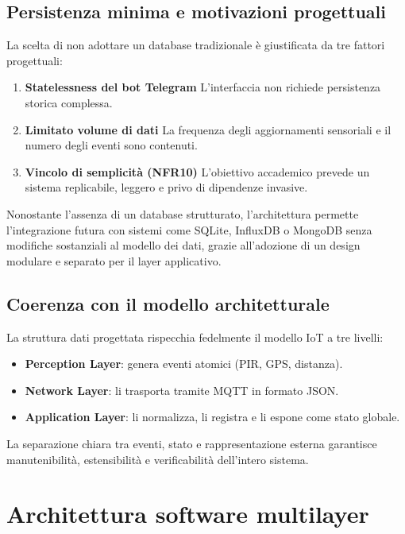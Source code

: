 \subsection*{Persistenza minima e motivazioni progettuali}

La scelta di non adottare un database tradizionale è giustificata da tre fattori progettuali:

\begin{enumerate}
    \item \textbf{Statelessness del bot Telegram}
    L'interfaccia non richiede persistenza storica complessa.

    \item \textbf{Limitato volume di dati}
    La frequenza degli aggiornamenti sensoriali e il numero degli eventi sono contenuti.

    \item \textbf{Vincolo di semplicità (NFR10)}
    L'obiettivo accademico prevede un sistema replicabile, leggero e privo di dipendenze invasive.
\end{enumerate}

Nonostante l'assenza di un database strutturato, l’architettura permette l'integrazione
futura con sistemi come SQLite, InfluxDB o MongoDB senza modifiche sostanziali al
modello dei dati, grazie all’adozione di un design modulare e separato per il layer applicativo.

\subsection*{Coerenza con il modello architetturale}

La struttura dati progettata rispecchia fedelmente il modello IoT a tre livelli:

\begin{itemize}
    \item \textbf{Perception Layer}: genera eventi atomici (PIR, GPS, distanza).
    \item \textbf{Network Layer}: li trasporta tramite MQTT in formato JSON.
    \item \textbf{Application Layer}: li normalizza, li registra e li espone come stato globale.
\end{itemize}

La separazione chiara tra eventi, stato e rappresentazione esterna garantisce
manutenibilità, estensibilità e verificabilità dell’intero sistema.


\section{Architettura software multilayer}

